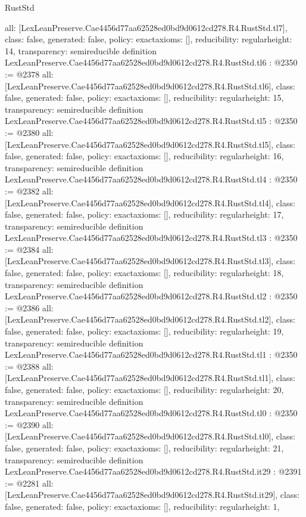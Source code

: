 \begin{lexlean}{RustStd}
\begin{coremodule}
{  all: [LexLeanPreserve.Cae4456d77aa62528ed0bd9d0612cd278.R4.RustStd.tl7],
  class: false,
  generated: false,
  policy: exact{axioms: []},
  reducibility: regular{height: 14},
  transparency: semireducible
}
definition LexLeanPreserve.Cae4456d77aa62528ed0bd9d0612cd278.R4.RustStd.tl6 : @2350 := @2378 {
  all: [LexLeanPreserve.Cae4456d77aa62528ed0bd9d0612cd278.R4.RustStd.tl6],
  class: false,
  generated: false,
  policy: exact{axioms: []},
  reducibility: regular{height: 15},
  transparency: semireducible
}
definition LexLeanPreserve.Cae4456d77aa62528ed0bd9d0612cd278.R4.RustStd.tl5 : @2350 := @2380 {
  all: [LexLeanPreserve.Cae4456d77aa62528ed0bd9d0612cd278.R4.RustStd.tl5],
  class: false,
  generated: false,
  policy: exact{axioms: []},
  reducibility: regular{height: 16},
  transparency: semireducible
}
definition LexLeanPreserve.Cae4456d77aa62528ed0bd9d0612cd278.R4.RustStd.tl4 : @2350 := @2382 {
  all: [LexLeanPreserve.Cae4456d77aa62528ed0bd9d0612cd278.R4.RustStd.tl4],
  class: false,
  generated: false,
  policy: exact{axioms: []},
  reducibility: regular{height: 17},
  transparency: semireducible
}
definition LexLeanPreserve.Cae4456d77aa62528ed0bd9d0612cd278.R4.RustStd.tl3 : @2350 := @2384 {
  all: [LexLeanPreserve.Cae4456d77aa62528ed0bd9d0612cd278.R4.RustStd.tl3],
  class: false,
  generated: false,
  policy: exact{axioms: []},
  reducibility: regular{height: 18},
  transparency: semireducible
}
definition LexLeanPreserve.Cae4456d77aa62528ed0bd9d0612cd278.R4.RustStd.tl2 : @2350 := @2386 {
  all: [LexLeanPreserve.Cae4456d77aa62528ed0bd9d0612cd278.R4.RustStd.tl2],
  class: false,
  generated: false,
  policy: exact{axioms: []},
  reducibility: regular{height: 19},
  transparency: semireducible
}
definition LexLeanPreserve.Cae4456d77aa62528ed0bd9d0612cd278.R4.RustStd.tl1 : @2350 := @2388 {
  all: [LexLeanPreserve.Cae4456d77aa62528ed0bd9d0612cd278.R4.RustStd.tl1],
  class: false,
  generated: false,
  policy: exact{axioms: []},
  reducibility: regular{height: 20},
  transparency: semireducible
}
definition LexLeanPreserve.Cae4456d77aa62528ed0bd9d0612cd278.R4.RustStd.tl0 : @2350 := @2390 {
  all: [LexLeanPreserve.Cae4456d77aa62528ed0bd9d0612cd278.R4.RustStd.tl0],
  class: false,
  generated: false,
  policy: exact{axioms: []},
  reducibility: regular{height: 21},
  transparency: semireducible
}
definition LexLeanPreserve.Cae4456d77aa62528ed0bd9d0612cd278.R4.RustStd.it29 : @2391 := @2281 {
  all: [LexLeanPreserve.Cae4456d77aa62528ed0bd9d0612cd278.R4.RustStd.it29],
  class: false,
  generated: false,
  policy: exact{axioms: []},
  reducibility: regular{height: 1},
}
\end{coremodule}
\end{lexlean}
